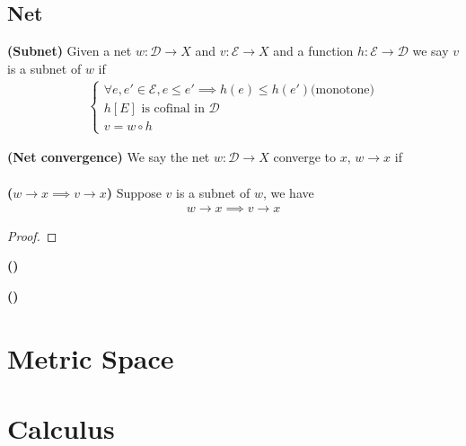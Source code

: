 \documentclass{report}
\begin{document}
\section{Net}
\begin{definition}
\label{1.2.1}
  \textbf{(Subnet)} Given a net $w:\mathcal{D}\rightarrow X$ and $v:\mathcal{E}\rightarrow X$ and a function $h:\mathcal{E}\rightarrow \mathcal{D}$ we say $v$ is a subnet of $w$ if  
\begin{align*}
\begin{cases}
\forall e,e' \in \mathcal{E}, e\leq e' \implies h(e)\leq h(e')\text{(monotone)}\\
h[E]\text{ is cofinal in $\mathcal{D}$ }\\
v=w\circ h
\end{cases}
\end{align*}
\end{definition}
\begin{definition}
\textbf{(Net convergence)} We say the net $w:\mathcal{D}\rightarrow X$ converge to $x$, $w \to x$ if 
\begin{align*}

\end{align*}
\end{definition}
\begin{theorem}
\textbf{($w \to x \implies v \to x$)} Suppose $v$ is a subnet of $w$, we have 
 \begin{align*}
w \to x \implies v \to x
\end{align*}
\end{theorem}
\begin{proof}

\end{proof}
\begin{theorem}
\textbf{()}
\end{theorem}
\begin{definition}
\textbf{()}
\end{definition}
\chapter{Metric Space}
\section{}      
\chapter{Calculus}
\end{document}
